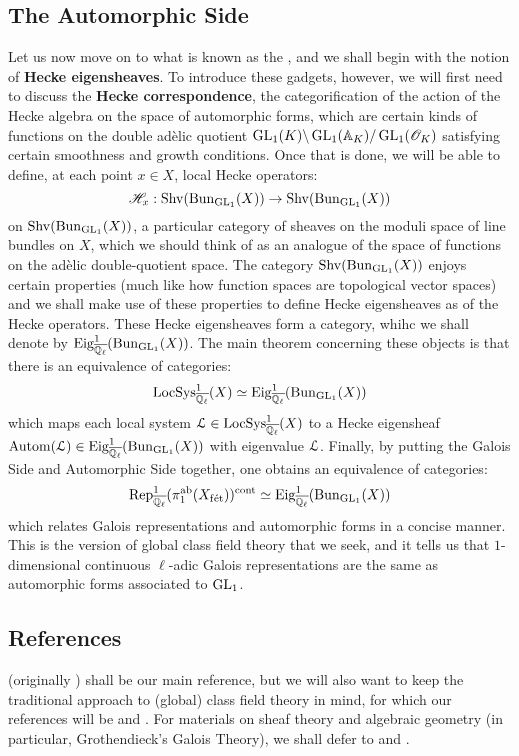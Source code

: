         \subsection{The Automorphic Side}
            Let us now move on to what is known as the , and we shall begin with the notion of \textbf{Hecke eigensheaves}. To introduce these gadgets, however, we will first need to discuss the \textbf{Hecke correspondence}, the categorification of the action of the Hecke algebra on the space of automorphic forms, which are certain kinds of functions on the double ad\`elic quotient $\operatorname{GL}_1(K) \backslash \operatorname{GL}_1(\mathbb{A}_K) / \operatorname{GL}_1(\mathscr{O}_K)$ satisfying certain smoothness and growth conditions. Once that is done, we will be able to define, at each point $x \in X$, local Hecke operators:
                $$\mathscr{H}_x: \mathrm{Shv}(\mathrm{Bun}_{\operatorname{GL}_1}(X)) \to \mathrm{Shv}(\mathrm{Bun}_{\operatorname{GL}_1}(X))$$
            on $\mathrm{Shv}(\mathrm{Bun}_{\operatorname{GL}_1}(X))$, a particular category of sheaves on the moduli space of line bundles on $X$, which we should think of as an analogue of the space of functions on the ad\`elic double-quotient space. The category $\mathrm{Shv}(\mathrm{Bun}_{\operatorname{GL}_1}(X))$ enjoys certain  properties (much like how function spaces are topological vector spaces) and we shall make use of these properties to define Hecke eigensheaves as  of the Hecke operators. These Hecke eigensheaves form a category, whihc we shall denote by $\mathrm{Eig}^1_{\overline{\mathbb{Q}_{\ell}}}(\mathrm{Bun}_{\operatorname{GL}_1}(X))$. The main theorem concerning these objects is that there is an equivalence of categories:
                $$\mathrm{LocSys}_{\overline{\mathbb{Q}_{\ell}}}^1(X) \simeq \mathrm{Eig}^1_{\overline{\mathbb{Q}_{\ell}}}(\mathrm{Bun}_{\operatorname{GL}_1}(X))$$
            which maps each local system $\mathcal{L} \in \mathrm{LocSys}_{\overline{\mathbb{Q}_{\ell}}}^1(X)$ to a Hecke eigensheaf $\mathrm{Autom}(\mathcal{L}) \in \mathrm{Eig}^1_{\overline{\mathbb{Q}_{\ell}}}(\mathrm{Bun}_{\operatorname{GL}_1}(X))$ with eigenvalue $\mathcal{L}$. Finally, by putting the Galois Side and Automorphic Side together, one obtains an equivalence of categories:
                $$\mathrm{Rep}_{\overline{\mathbb{Q}_{\ell}}}^1(\pi_1^{\mathrm{ab}}(X_{\mathrm{f\acute{e}t}}))^{\mathrm{cont}} \simeq \mathrm{Eig}^1_{\overline{\mathbb{Q}_{\ell}}}(\mathrm{Bun}_{\operatorname{GL}_1}(X))$$
            which relates Galois representations and automorphic forms in a concise manner. This is the version of global class field theory that we seek, and it tells us that $1$-dimensional continuous $\ell$-adic Galois representations are the same as automorphic forms associated to $\operatorname{GL}_1$.
	    
        \subsection{References}
    	    \cite{tendler_2015_geometric_class_field_theory} (originally \cite{tendler_2010_geometric_class_field_theory_original}) shall be our main reference, but we will also want to keep the traditional approach to (global) class field theory in mind, for which our references will be \cite[Chapter VI]{neukirch_2010_algebraic_number_theory} and \cite[Chapter VIII]{neukirch_1999_cohomology_of_number_field}. For materials on sheaf theory and algebraic geometry (in particular, Grothendieck's Galois Theory), we shall defer to \cite{stacks} and \cite[Expos\'e V]{SGA1}. 
    	    
	\printbibliography

